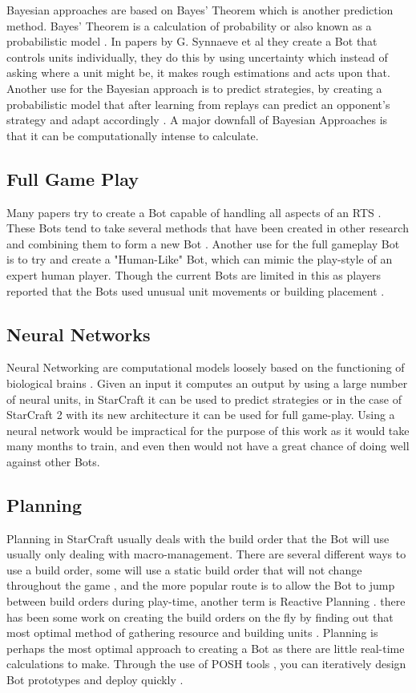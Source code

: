 \documentclass[journal]{IEEEtran}
\begin{document}
	Bayesian approaches are based on Bayes' Theorem which is another prediction method. Bayes' Theorem is a calculation of probability or also known as a probabilistic model \cite{BayesianAI}. In papers by G. Synnaeve et al \cite{UnitsControl,SpecialTactics} they create a Bot that controls units individually, they do this by using uncertainty which instead of asking where a unit might be, it makes rough estimations and acts upon that. Another use for the Bayesian approach is to predict strategies, by creating a probabilistic model that after learning from replays can predict an opponent's strategy and adapt accordingly \cite{Bayesian}. A major downfall of Bayesian Approaches is that it can be computationally intense to calculate.
	
	\subsection{Full Game Play}
	Many papers try to create a Bot capable of handling all aspects of an RTS \cite{Agents,Hierarchical,HumanLevel,SCAIL}. These Bots tend to take several methods that have been created in other research and combining them to form a new Bot \cite{Agents}. Another use for the full gameplay Bot is to try and create a "Human-Like" Bot, which can mimic the play-style of an expert human player. Though the current Bots are limited in this as players reported that the Bots used unusual unit movements or building placement \cite{EvalHuman}.
	
	\subsection{Neural Networks}
	Neural Networking are computational models loosely based on the functioning of biological brains \cite{Deep}. Given an input it computes an output by using a large number of neural units, in StarCraft it can be used to predict strategies or in the case of StarCraft 2 with its new architecture it can be used for full game-play. Using a neural network would be impractical for the purpose of this work as it would take many months to train, and even then would not have a great chance of doing well against other Bots.
	
	\subsection{Planning}
	Planning in StarCraft usually deals with the build order that the Bot will use usually only dealing with macro-management. There are several different ways to use a build order, some will use a static build order that will not change throughout the game \cite{Swen}, and the more popular route is to allow the Bot to jump between build orders during play-time, another term is Reactive Planning \cite{Fuzzy,OnlineEvo,GoalDriven}. there has been some work on creating the build orders on the fly by finding out that most optimal method of gathering resource and building units \cite{BuildOrder}. Planning is perhaps the most optimal approach to creating a Bot as there are little real-time calculations to make. Through the use of POSH tools \cite{POSH}, you can iteratively design Bot prototypes and deploy quickly \cite{Swen}. 
	
\end{document}
